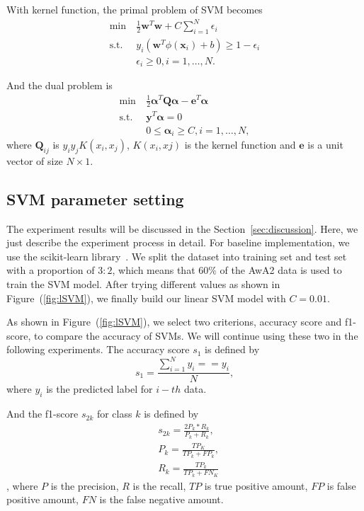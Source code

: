 \documentclass{article}
\newcommand{\Qmat}[0]{{{\boldsymbol Q}}}
\newcommand{\ev}[0]{{\boldsymbol{e}}}
\newcommand{\wv}{\boldsymbol{w}}
\newcommand{\xv}{\boldsymbol{x}}
\newcommand{\yv}{\boldsymbol{y}}
\newcommand{\alphav}{\boldsymbol{\alpha}}
\DeclareMathOperator{\mst}{s.t.}
\begin{document}
With kernel function, the primal problem of SVM becomes
\begin{equation}
	\label{eq:svm}
	\begin{split}
	\min~&\frac{1}{2} \wv^T\wv + C\sum_{i=1}^{N} \epsilon_i\\
	\mst~&y_i(\wv^T\phi(\xv_i)+b)\geq 1-\epsilon_i\\
	&\epsilon_i\geq0, i =1,\ldots,N.
	\end{split}
\end{equation}

And the dual problem is
\begin{equation}
	\label{eq:svm_d}
	\begin{split}
	\min~&\frac{1}{2} \alphav^T\Qmat\alphav-\ev^T\alphav\\
	\mst~&\yv^T\alphav=0\\
	     &0\le\alphav_i\ge C, i=1,\ldots,N,
	\end{split}
\end{equation}
where $\Qmat_{ij}$ is $y_iy_jK(x_i,x_j)$, $K(x_i,xj)$ is the kernel function and $\ev$ is a unit vector of size $N\times1$. 

\subsection{SVM parameter setting}
The experiment results will be discussed in the Section~\ref{sec:discussion}. Here, we just describe the experiment process in detail. For baseline implementation, we use the scikit-learn library~\cite{sklearn}. We split the dataset into training set and test set with a proportion of $3:2$, which means that $60\%$ of the AwA2 data is used to train the SVM model. After trying different values as shown in Figure~(\ref{fig:lSVM}), we finally build our linear SVM model with $C=0.01$.

As shown in Figure~(\ref{fig:lSVM}), we select two criterions, accuracy score and f1-score, to compare the accuracy of SVMs. We will continue using these two in the following experiments. The accuracy score $s_1$ is defined by
\begin{equation}
	\label{eq:score}
	s_1 = \frac{\sum_{i=1}^{N}\hat{y_i} == y_i}{N},
\end{equation}
where $\hat{y_i}$ is the predicted label for $i-th$ data.

And the f1-score $s_{2k}$ for class $k$ is defined by
\begin{equation}
	\label{eq:f1-score}
	\begin{split}
	&s_{2k} = \frac{2P_k*R_k}{P_k+R_k},\\
	&P_k = \frac{TP_K}{TP_k+FP_k},\\
	&R_k = \frac{TP_k}{TP_k+FN_K}
	\end{split}
\end{equation},
where $P$ is the precision, $R$ is the recall, $TP$ is true positive amount, $FP$ is false positive amount, $FN$ is the false negative amount.
\end{document}
